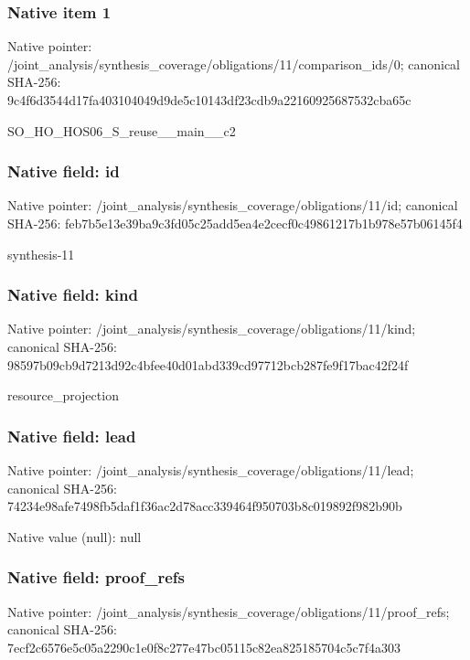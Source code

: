 \documentclass[10pt,a4paper]{article}
\begin{document}
\subsubsection{Native item 1}
Native pointer: /joint\_\allowbreak{}analysis/synthesis\_\allowbreak{}coverage/obligations/11/comparison\_\allowbreak{}ids/0; canonical SHA-256: 9c4f6d3544d17fa403104049d9de5c10143df23cdb9a22160925687532cba65c

\begingroup\raggedright\sloppy SO\_\allowbreak{}HO\_\allowbreak{}HOS06\_\allowbreak{}S\_\allowbreak{}reuse\_\allowbreak{}\_\allowbreak{}main\_\allowbreak{}\_\allowbreak{}c2\par\endgroup

\subsubsection{Native field: id}
Native pointer: /joint\_\allowbreak{}analysis/synthesis\_\allowbreak{}coverage/obligations/11/id; canonical SHA-256: feb7b5e13e39ba9c3fd05c25add5ea4e2cecf0c49861217b1b978e57b06145f4

\begingroup\raggedright\sloppy synthesis-11\par\endgroup

\subsubsection{Native field: kind}
Native pointer: /joint\_\allowbreak{}analysis/synthesis\_\allowbreak{}coverage/obligations/11/kind; canonical SHA-256: 98597b09cb9d7213d92c4bfee40d01abd339cd97712bcb287fe9f17bac42f24f

\begingroup\raggedright\sloppy resource\_\allowbreak{}projection\par\endgroup

\subsubsection{Native field: lead}
Native pointer: /joint\_\allowbreak{}analysis/synthesis\_\allowbreak{}coverage/obligations/11/lead; canonical SHA-256: 74234e98afe7498fb5daf1f36ac2d78acc339464f950703b8c019892f982b90b

Native value (null): null

\subsubsection{Native field: proof\_\allowbreak{}refs}
Native pointer: /joint\_\allowbreak{}analysis/synthesis\_\allowbreak{}coverage/obligations/11/proof\_\allowbreak{}refs; canonical SHA-256: 7ecf2c6576e5c05a2290c1e0f8c277e47bc05115c82ea825185704c5c7f4a303
\end{document}
